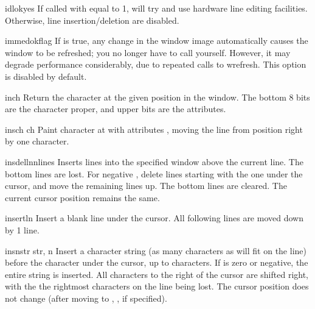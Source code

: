 \begin{methoddesc}{idlok}{yes}
If called with  equal to 1,  will try and use
hardware line editing facilities. Otherwise, line insertion/deletion
are disabled.
\end{methoddesc}

\begin{methoddesc}{immedok}{flag}
If  is true, any change in the window image
automatically causes the window to be refreshed; you no longer
have to call  yourself.  However, it may
degrade performance considerably, due to repeated calls to
wrefresh.  This option is disabled by default.
\end{methoddesc}

\begin{methoddesc}{inch}{}
Return the character at the given position in the window. The bottom
8 bits are the character proper, and upper bits are the attributes.
\end{methoddesc}

\begin{methoddesc}{insch}{ ch}
Paint character  at  with attributes
, moving the line from position  right by one
character.
\end{methoddesc}

\begin{methoddesc}{insdelln}{nlines}
Inserts  lines into the specified window above the current
line.  The  bottom lines are lost.  For negative
, delete  lines starting with the one under
the cursor, and move the remaining lines up.  The bottom 
lines are cleared.  The current cursor position remains the same.
\end{methoddesc}

\begin{methoddesc}{insertln}{}
Insert a blank line under the cursor. All following lines are moved
down by 1 line.
\end{methoddesc}

\begin{methoddesc}{insnstr}{ str, n }
Insert a character string (as many characters as will fit on the line)
before the character under the cursor, up to  characters.  
If  is zero or negative,
the entire string is inserted.
All characters to the right of
the cursor are shifted right, with the the rightmost characters on the
line being lost.  The cursor position does not change (after moving to
, , if specified). 
\end{methoddesc}

